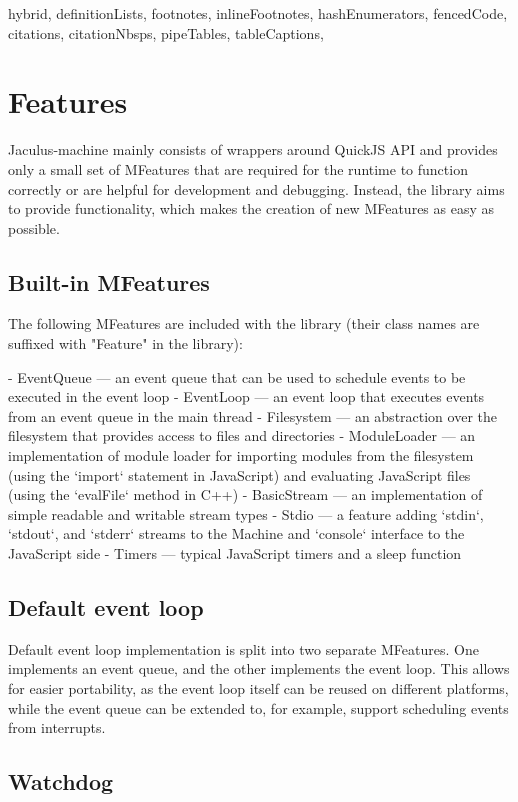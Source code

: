 \begin{markdown*}{%
  hybrid,
  definitionLists,
  footnotes,
  inlineFootnotes,
  hashEnumerators,
  fencedCode,
  citations,
  citationNbsps,
  pipeTables,
  tableCaptions,
}
\section{Features}

Jaculus-machine mainly consists of wrappers around QuickJS API and provides only a small set of MFeatures that are required for the runtime to function correctly or are helpful for development and debugging. Instead, the library aims to provide functionality, which makes the creation of new MFeatures as easy as possible.

\subsection{Built-in MFeatures}

The following MFeatures are included with the library (their class names are suffixed with "Feature" in the library):

  - EventQueue --- an event queue that can be used to schedule events to be executed in the event loop
  - EventLoop --- an event loop that executes events from an event queue in the main thread
  - Filesystem --- an abstraction over the filesystem that provides access to files and directories
  - ModuleLoader --- an implementation of module loader for importing modules from the filesystem (using the `import` statement in JavaScript) and evaluating JavaScript files (using the `evalFile` method in C++)
  - BasicStream --- an implementation of simple readable and writable stream types
  - Stdio --- a feature adding `stdin`, `stdout`, and `stderr` streams to the Machine and `console` interface to the JavaScript side
  - Timers --- typical JavaScript timers and a sleep function

\subsection{Default event loop}

Default event loop implementation is split into two separate MFeatures. One implements an event queue, and the other implements the event loop. This allows for easier portability, as the event loop itself can be reused on different platforms, while the event queue can be extended to, for example, support scheduling events from interrupts.

\subsection{Watchdog}


\end{markdown*}
